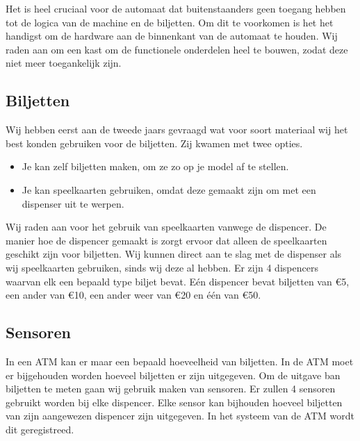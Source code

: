\documentclass{article}
\begin{document}
Het is heel cruciaal voor de automaat dat buitenstaanders geen toegang hebben tot de logica van de machine en de biljetten.
Om dit te voorkomen is het het handigst om de hardware aan de binnenkant van de automaat te houden.
Wij raden aan om een kast om de functionele onderdelen heel te bouwen, zodat deze niet meer toegankelijk zijn.

\subsection{Biljetten}

Wij hebben eerst aan de tweede jaars gevraagd wat voor soort materiaal wij het best konden gebruiken voor de biljetten.
Zij kwamen met twee opties.
\begin{itemize}
\item Je kan zelf biljetten maken, om ze zo op je model af te stellen.
\item Je kan speelkaarten gebruiken, omdat deze gemaakt zijn om met een dispenser uit te werpen.
\end{itemize}

Wij raden aan voor het gebruik van speelkaarten vanwege de dispencer.
De manier hoe de dispencer gemaakt is zorgt ervoor dat alleen de speelkaarten geschikt zijn voor biljetten.
Wij kunnen direct aan te slag met de dispenser als wij speelkaarten gebruiken, sinds wij deze al hebben.
Er zijn 4 dispencers waarvan elk een bepaald type biljet bevat.
E\'en dispencer bevat biljetten van \euro{5},
een ander van \euro{10},
een ander weer van \euro{20} en \'e\'en van \euro{50}.

\newpage

\subsection{Sensoren}
In een ATM kan er maar een bepaald hoeveelheid van biljetten.
In de ATM moet er bijgehouden worden hoeveel biljetten er zijn uitgegeven.
Om de uitgave ban biljetten te meten gaan wij gebruik maken van sensoren.
Er zullen 4 sensoren gebruikt worden bij elke dispencer.
Elke sensor kan bijhouden hoeveel biljetten van zijn aangewezen dispencer zijn uitgegeven.
In het systeem van de ATM wordt dit geregistreed.
\end{document}
